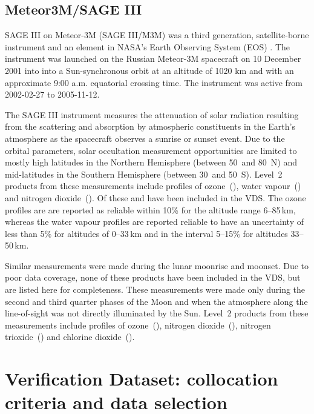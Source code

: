 \subsection{Meteor3M/SAGE III}


SAGE III on Meteor-3M (SAGE III/M3M) was a third generation, satellite-borne
instrument and an element in NASA's Earth Observing System (EOS) \citep{SAGEIII_DPUG}. 
The instrument was launched on the Russian Meteor-3M spacecraft on 10 December 2001
into into a Sun-synchronous orbit at an altitude of 1020 km and with an
approximate 9:00 a.m. equatorial crossing time.  The instrument was active from
2002-02-27 to 2005-11-12.

The SAGE III instrument measures the attenuation of solar radiation resulting
from the scattering and absorption by atmospheric constituents in the Earth's
atmosphere as the spacecraft observes a sunrise or sunset event.  Due to the
orbital parameters, solar occultation measurement opportunities are limited to
mostly high latitudes in the Northern Hemisphere (between 50\degree~and
80\degree~N) and mid-latitudes in the Southern Hemisphere (between
30\degree~and 50\degree~S).  Level~2 products from these measurements include
profiles of ozone~(), water vapour~() and nitrogen
dioxide~().  Of these  and  have been included
in the VDS.  The ozone profiles are are reported as reliable within 10\% for
the altitude range 6--85\,km, whereas the water vapour profiles are reported
reliable to have an uncertainty of less than 5\% for altitudes of 0--33\,km and
in the interval 5--15\% for altitudes 33--50\,km.

Similar measurements were made during the lunar moonrise and moonset. Due to
poor data coverage, none of these products have been included in the VDS, but
are listed here for completeness.  These measurements were made only during the
second and third quarter phases of the Moon and when the atmosphere along the
line-of-sight was not directly illuminated by the Sun.  Level~2 products from
these measurements include profiles of ozone~(), nitrogen
dioxide~(), nitrogen trioxide~() and chlorine
dioxide~().


\section{Verification Dataset: collocation criteria and data selection}
\label{sec:vdsselection}

